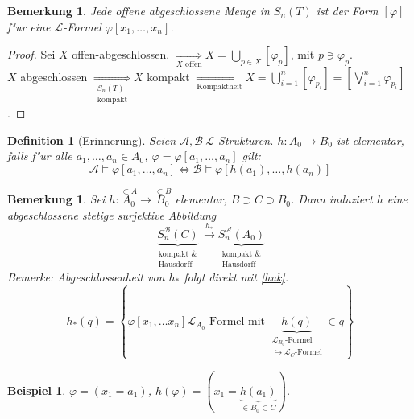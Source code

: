 \documentclass[a4paper,12pt,numbers=noenddot,parskip=full]{scrartcl}
\newcommand{\scrL}{\mathcal{L}}
\newcommand{\scrA}{\mathcal{A}}
\newcommand{\scrB}{\mathcal{B}}
\theoremstyle{dotless}
\newtheorem{definition}[theorem]{Definition}
\newtheorem{example}[theorem]{Beispiel}
\newtheorem{remark}[theorem]{Bemerkung}
\begin{document}
\begin{remark}
	Jede offene abgeschlossene Menge in $S_n(T)$ ist der Form $[\varphi]$ f"ur eine $\scrL$-Formel $\varphi[x_1, \dots, x_n]$.
\end{remark}
\begin{proof}
	Sei $X$ offen-abgeschlossen. $\underset{X \text{ offen}}{\Longrightarrow} X = \bigcup\limits_{p \in X} [\varphi_p]$, mit $p \ni \varphi_p$.\\
	$X$ abgeschlossen $\underset{\substack{S_n(T)\\\text{kompakt}}}{\Longrightarrow} X$ kompakt $\underset{\text{Kompaktheit}}{\Longrightarrow} X = \bigcup\limits_{i=1}^n [\varphi_{p_i}] = [\bigvee\limits_{i=1}^n \varphi_{p_i}]$.
\end{proof}
\begin{definition}[Erinnerung]
	Seien $\scrA, \scrB ~\scrL$-Strukturen. $h: A_0 \longrightarrow B_0$ ist elementar, falls f"ur alle $a_1, \dots, a_n \in A_0$, $\varphi=\varphi[a_1, \dots, a_n]$ gilt:
	\begin{equation*}
		\scrA \models \varphi[a_1, \dots, a_n] \Longleftrightarrow \scrB \models \varphi[h(a_1), \dots, h(a_n)]
	\end{equation*}
\end{definition}
\begin{remark}\label{hstern}
	Sei $h: \overset{\subset A}{A_0} \longrightarrow \overset{\subset B}{B_0}$ elementar, $B \supset C \supset B_0$. Dann induziert $h$ eine abgeschlossene stetige surjektive Abbildung
	\begin{equation*}
		\underbrace{S_n^\scrB(C)}_{\substack{\text{kompakt \&}\\\text{Hausdorff}}} \overset{h_*}{\longrightarrow} \underbrace{S_n^\scrA(A_0)}_{\substack{\text{kompakt \&}\\\text{Hausdorff}}}
	\end{equation*}
	\emph{Bemerke:} Abgeschlossenheit von $h_*$ folgt direkt mit \ref{huk}.
	\begin{equation*}
		h_*(q) = \left\{\varphi[x_1, \dots x_n] \scrL_{A_0} \text{-Formel mit } \underbrace{h(q)}_{\substack{\scrL_{B_0} \text{-Formel}\\\hookrightarrow \scrL_C \text{-Formel}}} \in q \right\}
	\end{equation*}
\end{remark}
\begin{example}
	$\varphi = (x_1 \dot= a_1)$, $h(\varphi) = (x_1 \dot= \underbrace{h(a_1)}_{\in B_0 \subset C})$.
\end{example}
\end{document}
